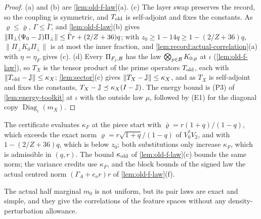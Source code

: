 \begin{proof}
(a) and (b) are \cref{lem:old-f-law}(a). (c) The layer swap preserves the
record, so the coupling is symmetric, and $T_{\rm old}$ is self-adjoint and
fixes the constants. As $\varrho\le\bar\varrho$, $\Gamma\le\bar\Gamma$, and
\cref{lem:old-f-law}(b) gives
$\|\Pi_\perp(\Psi_0-\mathbb J)\Pi_\perp\|\le\bar\Gamma r+(2/Z+36)q$; with
$z_0\ge1-14q\ge1-(2/Z+36)q$, $\|\Pi_\perp K_0\Pi_\perp\|$ is at most the inner
fraction, and \cref{lem:record:actual-correlation}(a) with $\eta=\eta_F$ gives
(c). (d) Every $\Pi_{F_j,\mathcal B}$ has the law $\bigotimes_{p\in\mathcal B}K_{0,p}$ at $\iota$
(\cref{lem:old-f-law}), so $T_X$ is the tensor product of the prime operators
$T_{\rm old}$, each with $\|T_{\rm old}-\mathbb J\|\le\kappa_X$;
\cref{lem:sector}(c) gives $\|T_X-\mathbb J\|\le\kappa_X$, and as $T_X$ is
self-adjoint and fixes the constants, $T_X-\mathbb J\preceq\kappa_X(I-\mathbb J)$. The
energy bound is (P3) of \cref{lem:energy-toolkit} at $\iota$ with the outside
law $\mu$, followed by (E1) for the diagonal copy $\operatorname{Diag}_\iota(m_X)$.
\end{proof}

The certificate evaluates $\kappa_F$ at the piece start with
$\bar\varrho=r(1+q)/(1-q)$, which exceeds the exact norm
$\varrho=r\sqrt{1+q}/(1-q)$ of $V_0^*V_2$, and with $1-(2/Z+36)q$, which is
below $z_0$; both substitutions only increase $\kappa_F$, which is admissible
in $(q,r)$. The bound $\kappa_{\rm old}$ of \cref{lem:old-f-law}(c) bounds the
same norm; the variance credits use $\kappa_F$, and the block bounds of the
signed law the actual centred norm $(\Gamma_A+e_or)r$ of
\cref{lem:old-f-law}(f).

The actual half marginal $m_0$ is not uniform, but its pair laws are exact
and simple, and they give the correlations of the feature spaces without any
density-perturbation allowance.


